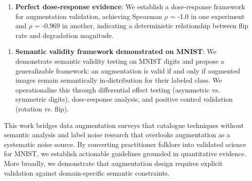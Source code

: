 \begin{enumerate}
\item \textbf{Perfect dose-response evidence}: We establish a dose-response framework for augmentation validation, achieving Spearman $\rho$ = -1.0 in one experiment and $\rho$ = -0.969 in another, indicating a deterministic relationship between flip rate and degradation magnitude.
\end{enumerate}

\begin{enumerate}
\item \textbf{Semantic validity framework demonstrated on MNIST}: We demonstrate semantic validity testing on MNIST digits and propose a generalizable framework: an augmentation is valid if and only if augmented images remain semantically in-distribution for their labeled class. We operationalize this through differential effect testing (asymmetric vs. symmetric digits), dose-response analysis, and positive control validation (rotation vs. flip).
\end{enumerate}

This work bridges data augmentation surveys that catalogue techniques without semantic analysis and label noise research that overlooks augmentation as a systematic noise source. By converting practitioner folklore into validated science for MNIST, we establish actionable guidelines grounded in quantitative evidence. More broadly, we demonstrate that augmentation design requires explicit validation against domain-specific semantic constraints.

